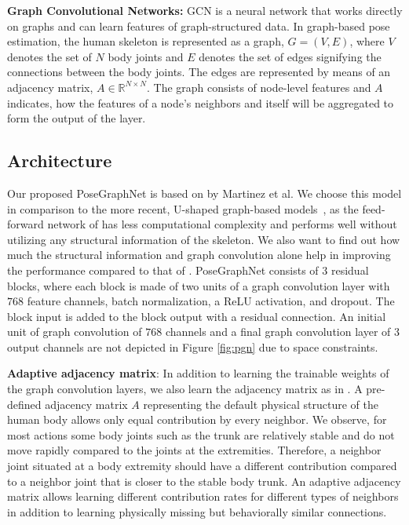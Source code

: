 \documentclass{article}
\begin{document}
\textbf{Graph Convolutional Networks:} GCN is a neural network that works directly on graphs and can learn features of graph-structured data.
In graph-based pose estimation, the human skeleton is represented as a graph, $G=(V,E)$, where $V$ denotes the set of $N$ body joints and $E$ denotes the set of edges signifying the connections between the body joints. The edges are represented by means of an adjacency matrix, $A \in \mathbb{R}^{N \times N}$.
The graph consists of node-level features and $A$ indicates, how the features of a node's neighbors and itself will be aggregated to form the output of the layer.

\subsection{Architecture}
\label{sec:archi}
Our proposed PoseGraphNet is based on \cite{Martinez2017} by Martinez et al. 
We choose this model in comparison to the more recent, U-shaped graph-based models~\cite{Cai2019,Doosti2020}, as the feed-forward network of \cite{Martinez2017} has less computational complexity and performs well without utilizing any structural information of the skeleton. 
We also want to find out how much the structural information and graph convolution alone help in improving the performance compared to that of \cite{Martinez2017}.
PoseGraphNet consists of 3 residual blocks, where each block is made of two units of a graph convolution layer with $768$ feature channels, batch normalization, a ReLU activation, and dropout. The block input is added to the block output with a residual connection.
An initial unit of graph convolution of $768$ channels and a final graph convolution layer of 3 output channels are not depicted in Figure \ref{fig:pgn} due to space constraints.

\textbf{Adaptive adjacency matrix}: In addition to learning the trainable weights of the graph convolution layers, we also learn the adjacency matrix as in \cite{Doosti2020}.
A pre-defined adjacency matrix $A$ representing the default physical structure of the human body
allows only equal contribution by every neighbor.
We observe, for most actions some body joints such as the trunk are relatively stable and do not move rapidly compared to the joints at the extremities.
Therefore, a neighbor joint situated at a body extremity should have a different contribution compared to a neighbor joint that is closer to the stable body trunk.
An adaptive adjacency matrix allows learning different contribution rates for different types of neighbors in addition to learning physically missing but behaviorally similar connections.
\end{document}
